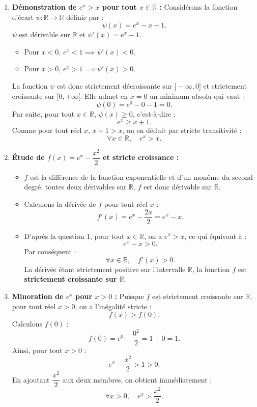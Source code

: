 \documentclass[11pt,a4paper]{article}
\newcommand{\R}{\mathbb{R}}
\begin{document}
\begin{correctionbox}[Exercice 12]
\begin{enumerate}[label=\textbf{\arabic*.}]
    \item \textbf{Démonstration de $e^x > x$ pour tout $x \in \R$ :}
    Considérons la fonction d'écart $\psi : \R \to \R$ définie par :
    \[
    \psi(x) = e^x - x - 1.
    \]
    $\psi$ est dérivable sur $\R$ et $\psi'(x) = e^x - 1$.
    \begin{itemize}
        \item Pour $x < 0$, $e^x < 1 \implies \psi'(x) < 0$.
        \item Pour $x > 0$, $e^x > 1 \implies \psi'(x) > 0$.
    \end{itemize}
    La fonction $\psi$ est donc strictement décroissante sur $]-\infty, 0]$ et strictement croissante sur $[0, +\infty[$.
    Elle admet en $x = 0$ un minimum absolu qui vaut :
    \[
    \psi(0) = e^0 - 0 - 1 = 0.
    \]
    Par suite, pour tout $x \in \R$, $\psi(x) \ge 0$, c'est-à-dire :
    \[
    e^x \ge x + 1.
    \]
    Comme pour tout réel $x$, $x + 1 > x$, on en déduit par stricte transitivité :
    \[
    \boxed{\forall x \in \R, \quad e^x > x}.
    \]

    \item \textbf{Étude de $f(x) = e^x - \dfrac{x^2}{2}$ et stricte croissance :}
    \begin{itemize}
        \item $f$ est la différence de la fonction exponentielle et d'un monôme du second degré, toutes deux dérivables sur $\R$. $f$ est donc dérivable sur $\R$.
        \item Calculons la dérivée de $f$ pour tout réel $x$ :
        \[
        f'(x) = e^x - \frac{2x}{2} = e^x - x.
        \]
        \item D'après la question 1, pour tout $x \in \R$, on a $e^x > x$, ce qui équivaut à :
        \[
        e^x - x > 0.
        \]
        Par conséquent :
        \[
        \forall x \in \R, \quad f'(x) > 0.
        \]
        La dérivée étant strictement positive sur l'intervalle $\R$, la fonction $f$ est \textbf{strictement croissante sur $\R$}.
    \end{itemize}

    \item \textbf{Minoration de $e^x$ pour $x > 0$ :}
    Puisque $f$ est strictement croissante sur $\R$, pour tout réel $x > 0$, on a l'inégalité stricte :
    \[
    f(x) > f(0).
    \]
    Calculons $f(0)$ :
    \[
    f(0) = e^0 - \frac{0^2}{2} = 1 - 0 = 1.
    \]
    Ainsi, pour tout $x > 0$ :
    \[
    e^x - \frac{x^2}{2} > 1 > 0.
    \]
    En ajoutant $\dfrac{x^2}{2}$ aux deux membres, on obtient immédiatement :
    \[
    \boxed{\forall x > 0, \quad e^x > \frac{x^2}{2}}.
    \]


\end{enumerate}
\end{correctionbox}
\end{document}

